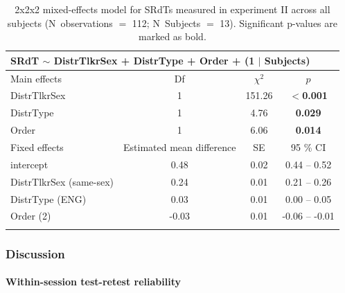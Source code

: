 \documentclass[a4paper, twoside]{templates/ociamthesis}
\begin{document}
\begin{table}[ht]
\caption{\label{tab:Exp2_LMEM}{2x2x2 mixed-effects model for SRdTs measured in experiment II across all subjects (N~observations $=$ 112; N~Subjects $=$ 13). Significant p-values are marked as bold.}}
\renewcommand{\arraystretch}{2}
\begin{tabular}{lccc}
\hline \hline
\multicolumn{4}{l}{SRdT $\sim$ DistrTlkrSex + DistrType + Order + (1 $\mid$ Subjects)} \\ \hline
Main effects          & Df                        & $\chi^2$ & $p$             \\ \hline
DistrTlkrSex          & 1                         & 151.26   & \textbf{$<$0.001} \\
DistrType             & 1                         & 4.76     & \textbf{0.029}  \\ \hline
Order                   & 1                         & 6.06    & \textbf{0.014}  \\ \hline
Fixed effects         & Estimated mean difference & SE       & 95 \% CI        \\ \hline
intercept             & 0.48                      & 0.02     & 0.44 – 0.52     \\
DistrTlkrSex (same-sex)  & 0.24                      & 0.01     & 0.21 – 0.26     \\
DistrType  (ENG)  & 0.03                     & 0.01     & 0.00 – 0.05   \\
Order  (2)  & -0.03                     & 0.01     & -0.06 – -0.01   \\ \hline \hline
\\
\end{tabular}
\end{table}

\hypertarget{discussion-1}{%
\subsubsection{Discussion}\label{discussion-1}}

\hypertarget{within-session-test-retest-reliability-1}{%
\paragraph{Within-session test-retest reliability}\label{within-session-test-retest-reliability-1}}
\end{document}
